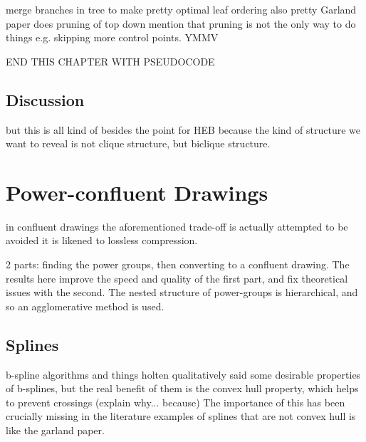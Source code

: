 merge branches in tree to make pretty
optimal leaf ordering also pretty
Garland paper does pruning of top down
mention that pruning is not the only way to do things e.g. skipping more control points. YMMV

END THIS CHAPTER WITH PSEUDOCODE

\subsection{Discussion}
but this is all kind of besides the point for HEB because the kind of structure we want to reveal is not clique structure, but biclique structure.

\section{Power-confluent Drawings}
in confluent drawings the aforementioned trade-off is actually attempted to be avoided
it is likened to lossless compression.

2 parts: finding the power groups, then converting to a confluent drawing. The results here improve the speed and quality of the first part, and fix theoretical issues with the second.
The nested structure of power-groups is hierarchical, and so an agglomerative method is used.
\subsection{Splines}
b-spline algorithms and things
holten qualitatively said some desirable properties of b-splines, but the real benefit of them is the convex hull property, which helps to prevent crossings (explain why... because)
The importance of this has been crucially missing in the literature
examples of splines that are not convex hull is like the garland paper.
